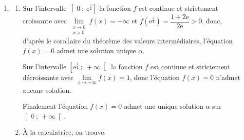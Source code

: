 \begin{enumerate}
\[1 - 2\ln(x) \geqslant 0 \iff -2 \ln(x) \geqslant -1 \iff \ln(x) \leqslant \dfrac{1}{2} \iff x \leqslant \text{e}^{\frac{1}{2}} \qquad (\text{car}\ x\mapsto \text{e}^{x}\ \text{est croissante})\]

\begin{minipage}{.6\linewidth}
\begin{center}
\end{center}
\end{minipage}\hfill
\begin{minipage}{.3\linewidth}
\begin{eqnarray*}
f\left(\text{e}^{\frac{1}{2}}\right) &=& \dfrac{\ln\left(\text{e}^{\frac{1}{2}}\right)}{\left(\text{e}^{\frac{1}{2}}\right)^{2}} + 1\\
	&=& \dfrac{\dfrac{1}{2}}{\text{e}^{2\times\frac{1}{2}}} + 1\\
	&=& \dfrac{1}{2\text{e}} + 1\\
	&=& \dfrac{1+2\text{e}}{2\text{e}} \approx 1, 184
\end{eqnarray*}
\end{minipage}
	\item
	\begin{enumerate}
	
		\item Sur l'intervalle \ensuremath{\left]0~;~\text{e}^{\frac{1}{2}}\right]} la fonction $f$ est continue et strictement croissante avec $\lim\limits_{\substack{x \to 0\\x > 0}}f(x) = -\infty$ et $f\left(\text{e}^{\frac{1}{2}}\right) = \dfrac{1+2\text{e}}{2\text{e}} > 0$, donc, d'après le corollaire du théorème des valeurs intermédiaires, l'équation $f(x) = 0$ admet une solution unique $\alpha$.

Sur l'intervalle \ensuremath{\left[\text{e}^{\frac{1}{2}}~;~+\infty\right[} la fonction $f$ est continue et strictement décroissante avec $\lim\limits_{x \to +\infty}f(x) = 1$, donc l'équation $f(x) = 0$ n'admet aucune solution.

Finalement l'équation $f(x) = 0$ admet une unique solution $\alpha$ sur \ensuremath{\left]0~;~+\infty\right[}.

		\item À la calculatrice, on trouve:


\end{enumerate}
\end{enumerate}
